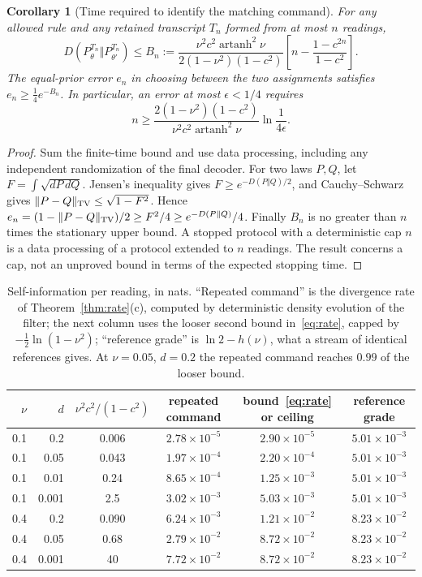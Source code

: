\documentclass[11pt,a4paper]{article}
\newtheorem{corollary}[definition]{Corollary}
\newcommand{\artanh}{\operatorname{artanh}}
\begin{document}
\begin{corollary}[Time required to identify the matching command]\label{cor:identificationtime}
For any allowed rule and any retained transcript $T_n$ formed from at most $n$ readings,
\[
 D(P_\theta^{T_n}\Vert P_{\theta'}^{T_n})\le
 B_n:=\frac{\nu^2c^2\artanh^2\nu}{2(1-\nu^2)(1-c^2)}
 \left[n-\frac{1-c^{2n}}{1-c^2}\right].
\]
The equal-prior error $e_n$ in choosing between the two assignments satisfies $e_n\ge\tfrac14 e^{-B_n}$. In particular, an error at most $\epsilon<1/4$ requires
\[
 n\ge\frac{2(1-\nu^2)(1-c^2)}{\nu^2c^2\artanh^2\nu}
       \ln\frac1{4\epsilon}.
\]
\end{corollary}
\begin{proof}
Sum the finite-time bound and use data processing, including any independent randomization of the final decoder. For two laws $P,Q$, let $F=\int\sqrt{dP\,dQ}$. Jensen's inequality gives $F\ge e^{-D(P\Vert Q)/2}$, and Cauchy--Schwarz gives $\|P-Q\|_{\rm TV}\le\sqrt{1-F^2}$. Hence $e_n=(1-\|P-Q\|_{\rm TV})/2\ge F^2/4\ge e^{-D(P\Vert Q)}/4$. Finally $B_n$ is no greater than $n$ times the stationary upper bound. A stopped protocol with a deterministic cap $n$ is a data processing of a protocol extended to $n$ readings. The result concerns a cap, not an unproved bound in terms of the expected stopping time.
\end{proof}

\begin{table}[ht]
\centering
\begin{tabular}{rrcccc}
\toprule
$\nu$ & $d$ & $\nu^2c^2/(1-c^2)$ & repeated command & bound~\eqref{eq:rate} or ceiling & reference grade\\
\midrule
0.1 & 0.2 & 0.006 & $2.78\times10^{-5}$ & $2.90\times10^{-5}$ & $5.01\times10^{-3}$\\
0.1 & 0.05 & 0.043 & $1.97\times10^{-4}$ & $2.20\times10^{-4}$ & $5.01\times10^{-3}$\\
0.1 & 0.01 & 0.24 & $8.65\times10^{-4}$ & $1.25\times10^{-3}$ & $5.01\times10^{-3}$\\
0.1 & 0.001 & 2.5 & $3.02\times10^{-3}$ & $5.03\times10^{-3}$ & $5.01\times10^{-3}$\\
0.4 & 0.2 & 0.090 & $6.24\times10^{-3}$ & $1.21\times10^{-2}$ & $8.23\times10^{-2}$\\
0.4 & 0.05 & 0.68 & $2.79\times10^{-2}$ & $8.72\times10^{-2}$ & $8.23\times10^{-2}$\\
0.4 & 0.001 & 40 & $7.72\times10^{-2}$ & $8.72\times10^{-2}$ & $8.23\times10^{-2}$\\
\bottomrule
\end{tabular}
\caption{Self-information per reading, in nats. ``Repeated command'' is the divergence rate of Theorem~\ref{thm:rate}(c), computed by deterministic density evolution of the filter; the next column uses the looser second bound in~\eqref{eq:rate}, capped by $-\frac12\ln(1-\nu^2)$; ``reference grade'' is $\ln2-h(\nu)$, what a stream of identical references gives. At $\nu=0.05$, $d=0.2$ the repeated command reaches $0.99$ of the looser bound.}
\label{tab:rate}
\end{table}
\end{document}
